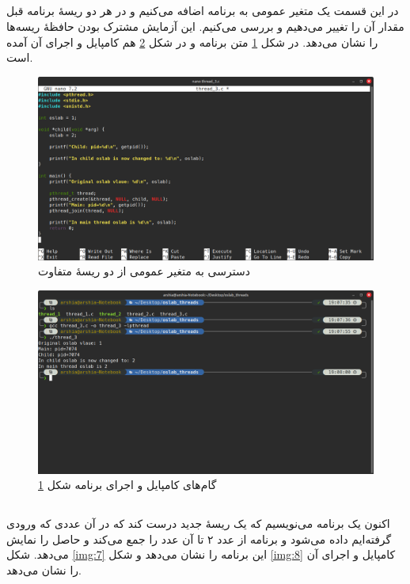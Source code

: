 \documentclass[12pt]{article}
\begin{document}
	\subsection{}
	در این قسمت یک متغیر عمومی به برنامه اضافه می‌کنیم و در هر دو ریسهٔ برنامه قبل مقدار آن را تغییر می‌دهیم و بررسی می‌کنیم. این آزمایش مشترک بودن حافظهٔ ریسه‌ها را نشان می‌دهد. در شکل \ref{img:5} متن برنامه و در شکل \ref{img:6} هم کامپایل و اجرای آن آمده است.
	\begin{figure}[H]
		\centering
		\includegraphics[width=\textwidth]{report7-resources/5.png}
		\caption{دسترسی به متغیر عمومی از دو ریسهٔ متفاوت}
		\label{img:5}
	\end{figure}
	\begin{figure}[H]
		\centering
		\includegraphics[width=\textwidth]{report7-resources/6.png}
		\caption{گام‌های کامپایل و اجرای برنامه شکل \ref{img:5}}
		\label{img:6}
	\end{figure}
	
	\subsection{}
	اکنون یک برنامه می‌نویسیم که یک ریسهٔ جدید درست کند که در آن عددی که ورودی گرفته‌ایم داده می‌شود و برنامه از عدد ۲ تا آن عدد را جمع می‌کند و حاصل را نمایش می‌دهد. شکل \ref{img:7} این برنامه را نشان می‌دهد و شکل \ref{img:8} کامپایل و اجرای آن را نشان می‌دهد.
	
\end{document}
